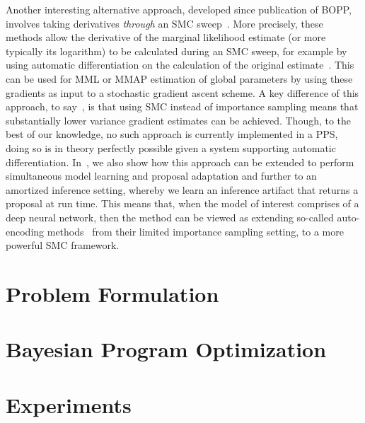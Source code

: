 Another interesting alternative approach,
developed since publication of BOPP, involves taking derivatives \emph{through} an SMC
sweep~\citep{le2017auto,naesseth2017variational,maddison2017filtering}. 
More precisely, these methods allow the derivative of the marginal likelihood estimate (or more typically
its logarithm) to be calculated during an SMC sweep, for example by using automatic differentiation
on the calculation of the original estimate~\citep{le2017auto}.  This can be used for MML or MMAP estimation
of global parameters by using these gradients as input to a stochastic gradient ascent scheme.
A key difference of this approach, to say~\cite{vandemeent2016black}, is that using SMC instead of importance
sampling means that substantially lower variance gradient estimates can be achieved.
Though, to the best of our knowledge, no such approach is currently implemented in a PPS, doing so is 
in theory perfectly possible given a system supporting automatic differentiation.  
In~\cite{le2017auto}, we also show how this approach can be extended to perform simultaneous model
learning and proposal adaptation and further to an amortized inference setting, whereby we learn an inference
artifact that returns a proposal at run time.  This means that, when the model of interest comprises of
a deep neural network, then the method can be viewed as extending so-called auto-encoding methods~\citep{kingma2014auto,burda2015importance}
from their limited importance sampling setting, to a more powerful SMC framework.

\section{Problem Formulation}
\label{sec:problem}



\section{Bayesian Program Optimization}
\label{sec:bopp}


%
%
%

\section{Experiments}
\label{sec:bopp:exp}


